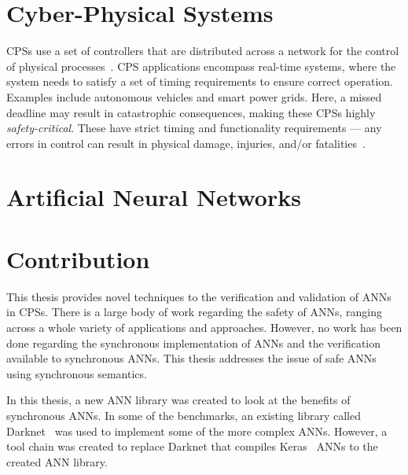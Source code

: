 \section{Cyber-Physical Systems}
\acp{CPS} use a set of controllers that are distributed across a network for the 
control of physical processes~\cite{alur2015principles}. \ac{CPS} applications encompass real-time systems, where 
the system needs to satisfy a set of timing requirements to ensure correct operation. Examples include autonomous vehicles and
smart power grids. Here, a missed deadline may result in catastrophic consequences, making these \acp{CPS} highly 
\textit{safety-critical}. 
These have strict timing and functionality requirements --- any errors in control can result in physical damage, injuries, and/or fatalities~\cite{ANNDevModel1999}. 

\section{Artificial Neural Networks}


\section{Contribution}
This thesis provides novel techniques to the verification and validation of \acfp{ANN} in \acfp{CPS}.
There is a large body of work regarding the safety of \acp{ANN}, ranging across a whole variety of applications and approaches.
However, no work has been done regarding the synchronous implementation of \acp{ANN} and the verification available to synchronous \acp{ANN}.  
This thesis addresses the issue of safe \acp{ANN} using synchronous semantics.

In this thesis, a new \ac{ANN} library was created to look at the benefits of synchronous \acp{ANN}.
In some of the benchmarks, an existing library called Darknet~\cite{darknet13} was used to implement some of the more complex \acp{ANN}.
However, a tool chain was created to replace Darknet that compiles Keras~\cite{chollet2015keras} \acp{ANN} to the created \ac{ANN} library.

